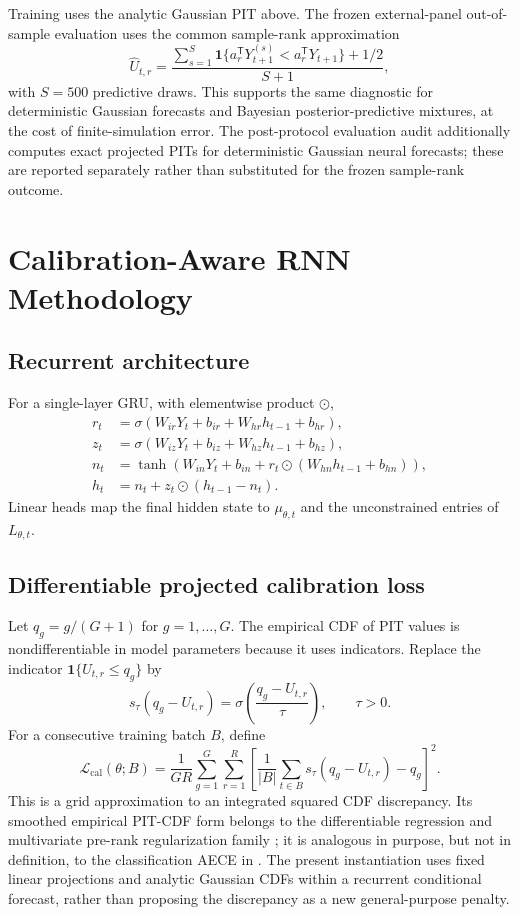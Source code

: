 \documentclass[11pt]{article}
\newcommand{\ind}{\mathbf{1}}
\begin{document}
Training uses the analytic Gaussian PIT above. The frozen external-panel
out-of-sample evaluation uses the common sample-rank approximation
\[
 \widehat U_{t,r}=\frac{\sum_{s=1}^{S}
 \ind\{a_r^{\mathsf T}Y_{t+1}^{(s)}<a_r^{\mathsf T}Y_{t+1}\}+1/2}{S+1},
\]
with $S=500$ predictive draws. This supports the same diagnostic for deterministic
Gaussian forecasts and Bayesian posterior-predictive mixtures, at the cost of
finite-simulation error.
The post-protocol evaluation audit additionally computes exact projected PITs
for deterministic Gaussian neural forecasts; these are reported separately
rather than substituted for the frozen sample-rank outcome.

\section{Calibration-Aware RNN Methodology}

\subsection{Recurrent architecture}

For a single-layer GRU, with elementwise product $\odot$,
\begin{align*}
r_t&=\sigma(W_{ir}Y_t+b_{ir}+W_{hr}h_{t-1}+b_{hr}),\\
z_t&=\sigma(W_{iz}Y_t+b_{iz}+W_{hz}h_{t-1}+b_{hz}),\\
n_t&=\tanh(W_{in}Y_t+b_{in}+r_t\odot(W_{hn}h_{t-1}+b_{hn})),\\
h_t&=n_t+z_t\odot(h_{t-1}-n_t).
\end{align*}
Linear heads map the final hidden state to $\mu_{\theta,t}$ and the unconstrained
entries of $L_{\theta,t}$.

\subsection{Differentiable projected calibration loss}

Let $q_g=g/(G+1)$ for $g=1,\ldots,G$. The empirical CDF of PIT values is
nondifferentiable in model parameters because it uses indicators. Replace the
indicator $\ind\{U_{t,r}\leq q_g\}$ by
\[
s_\tau(q_g-U_{t,r})
=\sigma\!\left(\frac{q_g-U_{t,r}}{\tau}\right),\qquad \tau>0.
\]
For a consecutive training batch $B$, define
\begin{equation}
\mathcal L_{\mathrm{cal}}(\theta;B)
=\frac{1}{GR}\sum_{g=1}^G\sum_{r=1}^R
\left[
\frac{1}{|B|}\sum_{t\in B}s_\tau(q_g-U_{t,r})-q_g
\right]^2.
\label{eq:cal-loss}
\end{equation}
This is a grid approximation to an integrated squared CDF discrepancy. Its
smoothed empirical PIT-CDF form belongs to the differentiable regression and
multivariate pre-rank regularization family
\cite{dheur2023large,desobry2025prerank,laajil2026prerank}; it is analogous
in purpose, but not in definition, to the classification AECE in
\cite{huang2024cabl}. The present instantiation uses fixed linear projections
and analytic Gaussian CDFs within a recurrent conditional forecast, rather
than proposing the discrepancy as a new general-purpose penalty.
\end{document}
